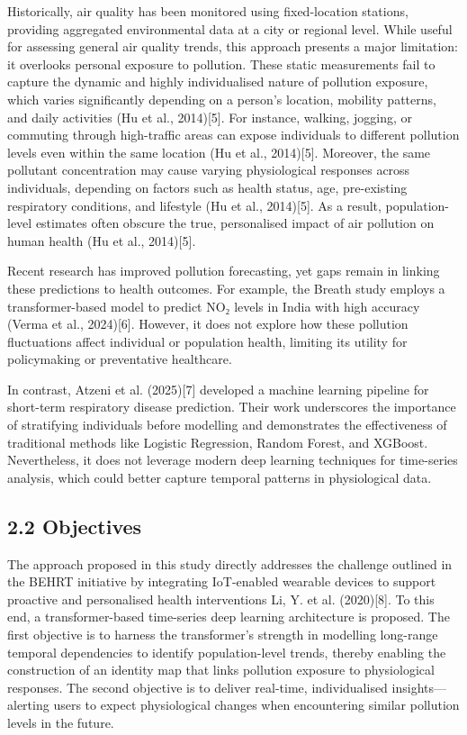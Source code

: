 \documentclass[
]{article}
\begin{document}
Historically, air quality has been monitored using fixed-location
stations, providing aggregated environmental data at a city or regional
level. While useful for assessing general air quality trends, this
approach presents a major limitation: it overlooks personal exposure to
pollution. These static measurements fail to capture the dynamic and
highly individualised nature of pollution exposure, which varies
significantly depending on a person's location, mobility patterns, and
daily activities (Hu et al., 2014){[}5{]}. For instance, walking,
jogging, or commuting through high-traffic areas can expose individuals
to different pollution levels even within the same location (Hu et al.,
2014){[}5{]}. Moreover, the same pollutant concentration may cause
varying physiological responses across individuals, depending on factors
such as health status, age, pre-existing respiratory conditions, and
lifestyle (Hu et al., 2014){[}5{]}. As a result, population-level
estimates often obscure the true, personalised impact of air pollution
on human health (Hu et al., 2014){[}5{]}.

Recent research has improved pollution forecasting, yet gaps remain in
linking these predictions to health outcomes. For example, the Breath
study employs a transformer-based model to predict NO₂ levels in India
with high accuracy (Verma et al., 2024){[}6{]}. However, it does not
explore how these pollution fluctuations affect individual or population
health, limiting its utility for policymaking or preventative
healthcare.

In contrast, Atzeni et al. (2025){[}7{]} developed a machine learning
pipeline for short-term respiratory disease prediction. Their work
underscores the importance of stratifying individuals before modelling
and demonstrates the effectiveness of traditional methods like Logistic
Regression, Random Forest, and XGBoost. Nevertheless, it does not
leverage modern deep learning techniques for time-series analysis, which
could better capture temporal patterns in physiological data.

\hypertarget{objectives}{%
\subsection{2.2 Objectives}\label{objectives}}

The approach proposed in this study directly addresses the challenge
outlined in the BEHRT initiative by integrating IoT-enabled wearable
devices to support proactive and personalised health interventions Li,
Y. et al. (2020){[}8{]}. To this end, a transformer-based time-series
deep learning architecture is proposed. The first objective is to
harness the transformer's strength in modelling long-range temporal
dependencies to identify population-level trends, thereby enabling the
construction of an identity map that links pollution exposure to
physiological responses. The second objective is to deliver real-time,
individualised insights---alerting users to expect physiological changes
when encountering similar pollution levels in the future.
\end{document}
